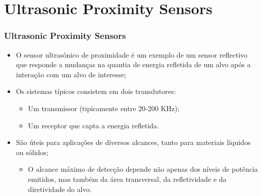 \documentclass[xcolor=dvipsnames, aspectratio=169]{beamer}
\begin{document}
\section[Ultrasonic Proximity Sensors]{Ultrasonic Proximity Sensors} 
\begin{frame}
\frametitle{Ultrasonic Proximity Sensors}
	\begin{itemize}
		\item O sensor ultrasônico de proximidade é um exemplo de um sensor reflectivo que responde a mudanças na quantia de energia refletida de um alvo após a interação com um alvo de interesse;
		\item Os sistemas típicos consistem em dois transdutores:
		\begin{itemize}
			\item Um transmissor (tipicamente entre 20-200 KHz);
			\item Um receptor que capta a energia refletida.
		\end{itemize}
		\item São úteis para aplicações de diversos alcances, tanto para materiais líquidos ou sólidos;
		\begin{itemize}
			\item O alcance máximo de detecção depende não apenas dos níveis de potência emitidos, mas também da área transversal, da refletividade e da diretividade do alvo.
		\end{itemize} 

	\end{itemize}
\end{frame}

\end{document}
